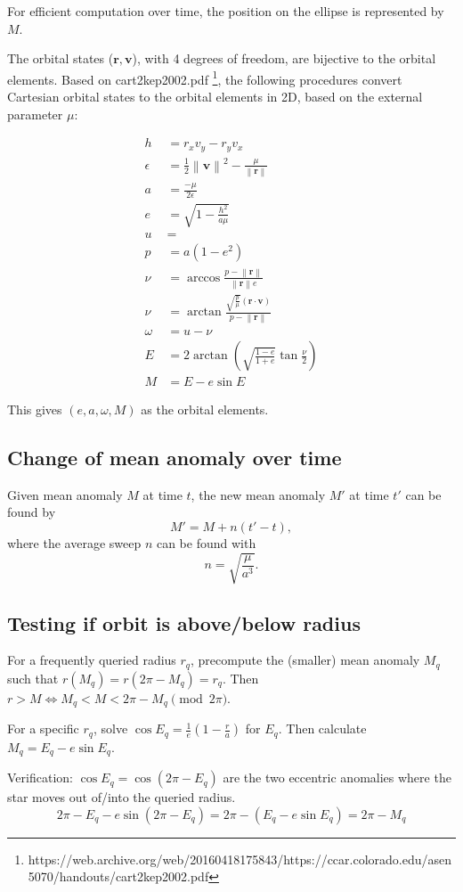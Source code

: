 \documentclass{article}
\def\p#1{ \left( #1 \right)}
\def\norm#1{ \left\lVert #1 \right\rVert}
\begin{document}
For efficient computation over time, the position on the ellipse is represented by $M$.

The orbital states ($\mathbf r, \mathbf v$), with 4 degrees of freedom,
are bijective to the orbital elements.
Based on cart2kep2002.pdf
\footnote{https://web.archive.org/web/20160418175843/https://ccar.colorado.edu/asen5070/handouts/cart2kep2002.pdf},
the following procedures convert Cartesian orbital states to the orbital elements in 2D,
based on the external parameter $\mu$:

\begin{align*}
	h &= r_x v_y - r_y v_x \\
	\epsilon &= \frac12 \norm{\mathbf v}^2 - \frac\mu{\norm{\mathbf r}} \\
	a &= \frac{-\mu}{2\epsilon} \\
	e &= \sqrt{1 - \frac{h^2}{a\mu}} \\
	u &= \\
	p &= a (1 - e^2) \\
	\nu &= \arccos \frac{p - \norm{\mathbf r}}{\norm{\mathbf r}e} \\
	\nu &= \arctan \frac{\sqrt{\frac p\mu} (\mathbf r \cdot \mathbf v)}{p - \norm{\mathbf r}} \\
	\omega &= u - \nu \\
	E &= 2 \arctan \p{\sqrt{\frac{1-e}{1+e}} \tan \frac\nu2} \\
	M &= E - e \sin E
\end{align*}

This gives $(e, a, \omega, M)$ as the orbital elements.

\subsection{Change of mean anomaly over time}
Given mean anomaly $M$ at time $t$,
the new mean anomaly $M'$ at time $t'$ can be found by
$$ M' = M + n (t' - t), $$
where the average sweep $n$ can be found with
$$ n = \sqrt{\frac\mu{a^3}}. $$

\subsection{Testing if orbit is above/below radius}
For a frequently queried radius $r_q$,
precompute the (smaller) mean anomaly $M_q$ such that
$ r(M_q) = r(2\pi - M_q) = r_q$.
Then $r > M \iff M_q < M < 2\pi - M_q \pmod{2\pi}$.

For a specific $r_q$,
solve $\cos E_q = \frac1e \p{1 - \frac ra}$ for $E_q$.
Then calculate $M_q = E_q - e \sin E_q$.

Verification: $\cos E_q = \cos(2 \pi - E_q)$ are the two eccentric anomalies
where the star moves out of/into the queried radius.
$$ 2\pi - E_q - e \sin(2\pi - E_q) = 2\pi - \p{E_q - e \sin E_q} = 2\pi - M_q $$
\end{document}
